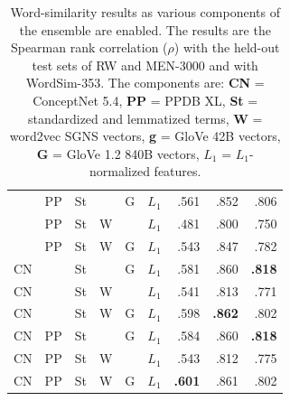 \documentclass[11pt,letterpaper]{article}
\begin{document}
\begin{table}[t]
\begin{tabular}{llllll|rrr}
\midrule
     & PP   & St   &      & G    & $L_1$  &    .561 &    .852 &    .806 \\  %
     & PP   & St   & W    &      & $L_1$  &    .481 &    .800 &    .750 \\  %
     & PP   & St   & W    & G    & $L_1$  &    .543 &    .847 &    .782 \\  %
CN   &      & St   &      & G    & $L_1$  &    .581 &    .860 &\bf .818 \\  %
CN   &      & St   & W    &      & $L_1$  &    .541 &    .813 &    .771 \\  %
CN   &      & St   & W    & G    & $L_1$  &    .598 &\bf .862 &    .802 \\  %
CN   & PP   & St   &      & G    & $L_1$  &    .584 &    .860 &\bf .818 \\  %
CN   & PP   & St   & W    &      & $L_1$  &    .543 &    .812 &    .775 \\  %
CN   & PP   & St   & W    & G    & $L_1$  &\bf .601 &    .861 &    .802 \\  %
\bottomrule
\end{tabular}

\caption{
    Word-similarity results as various components of the ensemble are enabled.
    The results are the Spearman rank correlation ($\rho$) with the held-out
    test sets of RW and MEN-3000 and with WordSim-353.
    The components are: {\bf CN} = ConceptNet 5.4,
    {\bf PP} = PPDB XL, {\bf St} = standardized and lemmatized terms,
    {\bf W} = word2vec SGNS vectors, {\bf g} = GloVe 42B vectors,
    {\bf G} = GloVe 1.2 840B vectors, {\bf $L_1$} = $L_1$-normalized features.
}
\label{eval-bigtable}
\end{table}
\end{document}
